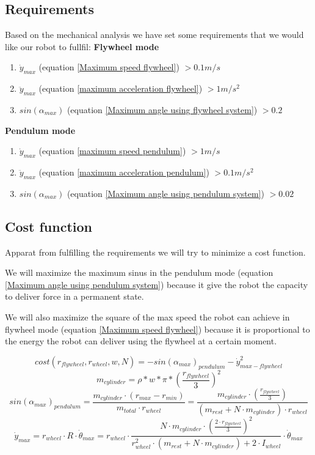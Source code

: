 \subsection{Requirements}
Based on the mechanical analysis we have set some requirements that we would like our robot to fullfil:
\textbf{Flywheel mode}
\begin{enumerate}
	\item $\dot{y}_{max}$ (equation \ref{Maximum speed flywheel}) $> 0.1m/s$
	\item $\ddot{y}_{max}$ (equation \ref{maximum acceleration flywheel}) $> 1m/s^2$
	\item $sin(\alpha_{max})$ (equation \ref{Maximum angle using flywheel system}) $> 0.2$
\end{enumerate}
\textbf{Pendulum mode}
\begin{enumerate}
	\item $\dot{y}_{max}$ (equation \ref{maximum speed pendulum}) $> 1m/s$
	\item $\ddot{y}_{max}$ (equation \ref{maximum acceleration pendulum}) $>0.1m/s^2$
	\item $sin(\alpha_{max})$ (equation \ref{Maximum angle using pendulum system}) $> 0.02$
\end{enumerate}
	


\subsection{Cost function}
Apparat from fulfilling the requirements we will try to minimize a cost function.

We will maximize the maximum sinus in the pendulum mode 
(equation \ref{Maximum angle using pendulum system}) because
it give the robot the capacity to deliver force in a permanent state.

We will also maximize the square of the max speed the robot can achieve
in flywheel mode (equation \ref{Maximum speed flywheel}) because it is
proportional to the energy the robot can deliver using the flywheel at a certain moment.

\begin{equation}
	cost(r_{flywheel},r_{wheel},w,N) = - sin(\alpha_{max})_{pendulum} -\dot{y}^2_{max-flywheel}
	\label{eq: cost}
\end{equation}
\begin{equation*}
	m_{cylinder} = \rho * w * \pi * (\frac{r_{flywheel}}{3})^2
\end{equation*}
\begin{equation*}
	sin(\alpha_{max})_{pendulum} = \frac{m_{cylinder} \cdot  (r_{max} - r_{min})}{m_{total} \cdot r_{wheel}} = \frac{m_{cylinder} \cdot  (\frac{r_{flywheel}}{3})}{(m_{rest} + N \cdot m_{cylinder})\cdot r_{wheel}} 	
\end{equation*}
\begin{equation*}
	\dot{y}_{max} = r_{wheel} \cdot  R \cdot  \dot{\theta}_{max} =r_{wheel} \cdot  \frac{ N \cdot  m_{cylinder} \cdot  (\frac{2\cdot r_{flywheel}}{3})^2}
    {r_{wheel}^2\cdot (m_{rest} + N \cdot m_{cylinder}) +  2\cdot I_{wheel}} \cdot  \dot{\theta}_{max}
\end{equation*}


